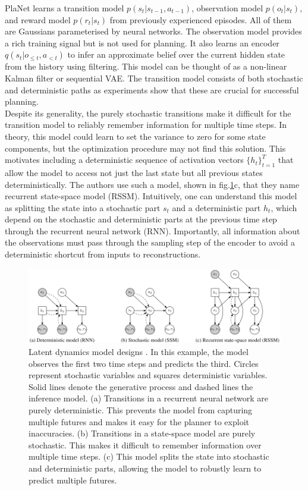 PlaNet learns a transition model $p(s_t | s_{t-1}, a_{t-1})$, observation model $p(o_t | s_t)$, and reward model $p(r_t | s_t)$ from previously experienced episodes. All of them are Gaussians parameterised by neural networks. The observation model provides a rich training signal but is not used for planning. It also learns an encoder $q(s_t | o_{\leqslant t}, a_{< t})$ to infer an approximate belief over the current hidden state from the history using filtering. This model can be thought of as a non-linear Kalman filter or sequential VAE. The transition model consists of both stochastic and deterministic paths as experiments show that these are crucial for successful planning. \\
Despite its generality, the purely stochastic transitions make it difficult for the transition model to reliably remember information for multiple time steps. In theory, this model could learn to set the variance to zero for some state components, but the optimization procedure may not find this solution. This motivates including a deterministic sequence of activation vectors $\{h_t\}^T_{t=1}$ that allow the model to access not just the last state but all previous states deterministically. The authors use such a model, shown in fig.\ref{Fig.PlaNetModelDesignes}c, that they name recurrent state-space model (RSSM). Intuitively, one can understand this model as splitting the state into a stochastic part $s_t$ and a deterministic part $h_t$, which depend on the stochastic and deterministic parts at the previous time step through the recurrent neural network (RNN). Importantly, all information about the observations must pass through the sampling step of the encoder to avoid a deterministic shortcut from inputs to reconstructions.

\begin{figure}[H]
\includegraphics[width=1.0\textwidth,keepaspectratio]{figures/PlaNet/models.png}
\caption[PlaNet latent dynamics model designs]{Latent dynamics model designs \protect\cite{Algo.PlaNet}. In this example, the model observes the first two time steps and predicts the third. Circles represent stochastic variables and squares deterministic variables. Solid lines denote the generative process and dashed lines the inference model. (a) Transitions in a recurrent neural network are purely deterministic. This prevents the model from capturing multiple futures and makes it easy for the planner to exploit inaccuracies. (b) Transitions in a state-space model are purely stochastic. This makes it difficult to remember information over multiple time steps. (c) This model splits the state into stochastic and deterministic parts, allowing the model to robustly learn to predict multiple futures.}
\label{Fig.PlaNetModelDesignes}
\end{figure}

